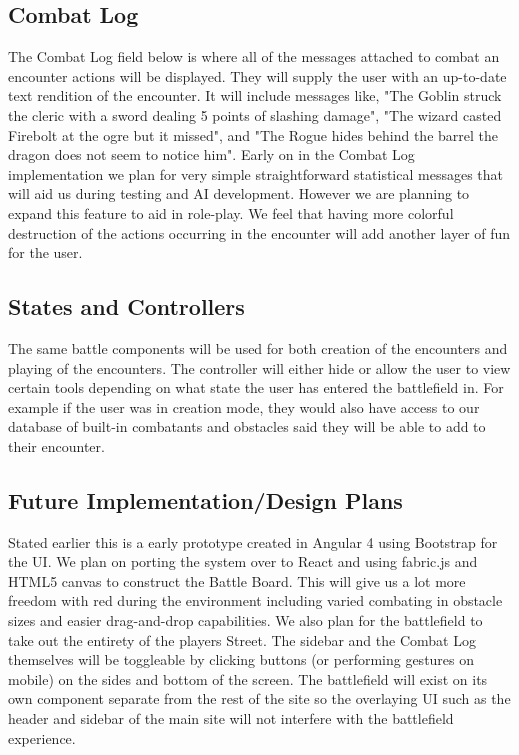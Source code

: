 \documentclass[12pt,a4paper]{report}
\begin{document}
\subsection {Combat Log}
The Combat Log field below is where all of the messages attached to combat an encounter actions will be displayed. They will supply the user with an up-to-date text rendition of the encounter. It will include messages like, "The Goblin struck the cleric with a sword dealing 5 points of slashing damage", "The wizard casted Firebolt at the ogre but it missed", and "The Rogue hides behind the barrel the dragon does not seem to notice him". Early on in the Combat Log implementation we plan for very simple straightforward statistical messages that will aid us during testing and AI development. However we are planning to expand this feature to aid in role-play. We feel that having more colorful destruction of the actions occurring in the encounter will add another layer of fun for the user. 
\subsection {States and Controllers }
The same battle components will be used for both creation of the encounters and playing of the encounters. The controller will either hide or allow the user to view certain tools depending on what state the user has entered the battlefield in. For example if the user was in creation mode, they would also have access to our database of built-in combatants and obstacles said they will be able to add to their encounter. 
\subsection {Future Implementation/Design Plans }
Stated earlier this is a early prototype created in Angular 4 using Bootstrap for the UI. We plan on porting the system over to React and using fabric.js and HTML5 canvas to construct the Battle Board. This will give us a lot more freedom with red during the environment including varied combating in obstacle sizes and easier drag-and-drop capabilities. We also plan for the battlefield to take out the entirety of the players Street. The sidebar and the Combat Log themselves will be toggleable by clicking buttons (or performing gestures on mobile) on the sides and bottom of the screen. The battlefield will exist on its own component separate from the rest of the site so the overlaying UI such as the header and sidebar of the main site will not interfere with the battlefield experience.
	\newpage
\end{document}
